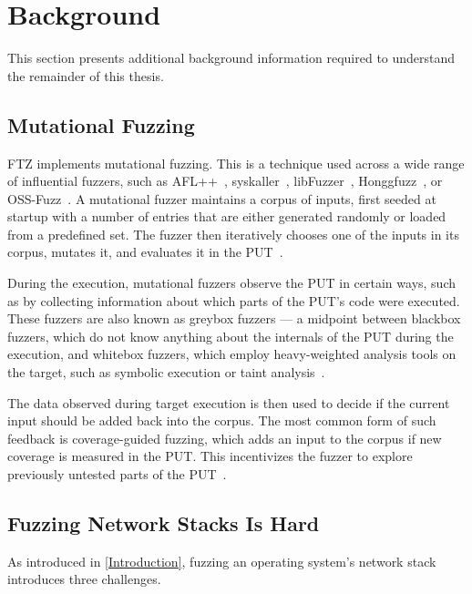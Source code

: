 \documentclass[twocolumn]{article}
\newcommand{\proj}{FTZ\xspace}
\let\savedCite=\cite
\renewcommand{\cite}{\unskip~\savedCite}
\begin{document}

\section{Background}
\label{Background}

This section presents additional background information required to understand the remainder of this thesis.

\subsection{Mutational Fuzzing}

\label{Background:MutationalFuzzing}
\proj implements mutational fuzzing. This is a technique used across a wide range of influential fuzzers, such as AFL++\cite{AFLPlusPlus}, syskaller\cite{syskaller}, libFuzzer\cite{libFuzzer}, Honggfuzz\cite{hongfuzz}, or OSS-Fuzz\cite{OSSFuzz}. A mutational fuzzer maintains a corpus of inputs, first seeded at startup with a number of entries that are either generated randomly or loaded from a predefined set. The fuzzer then iteratively chooses one of the inputs in its corpus, mutates it, and evaluates it in the PUT\cite{FuzzingBook}.

During the execution, mutational fuzzers observe the PUT in certain ways, such as by collecting information about which parts of the PUT's code were executed. These fuzzers are also known as greybox fuzzers — a midpoint between blackbox fuzzers, which do not know anything about the internals of the PUT during the execution, and whitebox fuzzers, which employ heavy-weighted analysis tools on the target, such as symbolic execution or taint analysis\cite{Demystifying}.

The data observed during target execution is then used to decide if the current input should be added back into the corpus. The most common form of such feedback is coverage-guided fuzzing, which adds an input to the corpus if new coverage is measured in the PUT. This incentivizes the fuzzer to explore previously untested parts of the PUT\cite{AFLPlusPlus}.

\subsection{Fuzzing Network Stacks Is Hard}
\label{Background:FuzzingNetworkStacksIsHard}

As introduced in \cref{Introduction}, fuzzing an operating system's network stack introduces three challenges.
\end{document}
